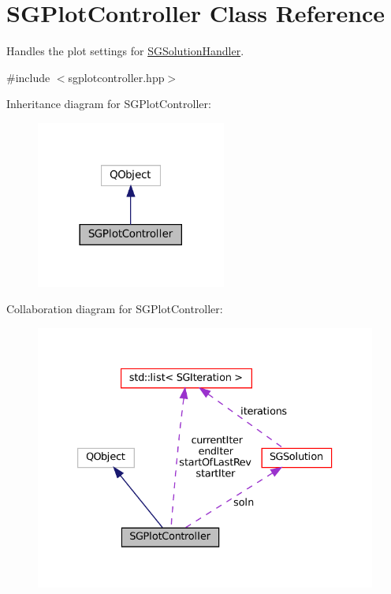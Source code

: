 \hypertarget{classSGPlotController}{}\section{S\+G\+Plot\+Controller Class Reference}
\label{classSGPlotController}


Handles the plot settings for \hyperlink{classSGSolutionHandler}{S\+G\+Solution\+Handler}.  




{\ttfamily \#include $<$sgplotcontroller.\+hpp$>$}



Inheritance diagram for S\+G\+Plot\+Controller\+:
\nopagebreak
\begin{figure}[H]
\begin{center}
\leavevmode
\includegraphics[width=177pt]{classSGPlotController__inherit__graph}
\end{center}
\end{figure}


Collaboration diagram for S\+G\+Plot\+Controller\+:
\nopagebreak
\begin{figure}[H]
\begin{center}
\leavevmode
\includegraphics[width=333pt]{classSGPlotController__coll__graph}
\end{center}
\end{figure}
